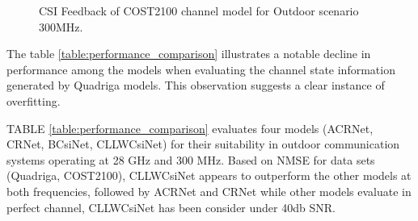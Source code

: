 \documentclass[lettersize,journal]{IEEEtran}
\begin{document}
	\begin{figure}[ht]
		\centering
		\hfill
		\hfill
		\caption{CSI Feedback of COST2100 channel model for Outdoor scenario 300MHz.}
		\label{fig:cost2100_300mhz}
	\end{figure}
	









The table \ref{table:performance_comparison} illustrates a notable decline in performance among the models when evaluating the channel state information generated by Quadriga models. This observation suggests a clear instance of overfitting.

TABLE \ref{table:performance_comparison} evaluates four models (ACRNet, CRNet, BCsiNet, CLLWCsiNet) for their suitability in outdoor communication systems operating at 28 GHz and 300 MHz. Based on NMSE for data sets (Quadriga, COST2100), CLLWCsiNet appears to outperform the other models at both frequencies, followed by ACRNet and CRNet while other models evaluate in perfect channel, CLLWCsiNet has been consider under 40db SNR.
\end{document}
